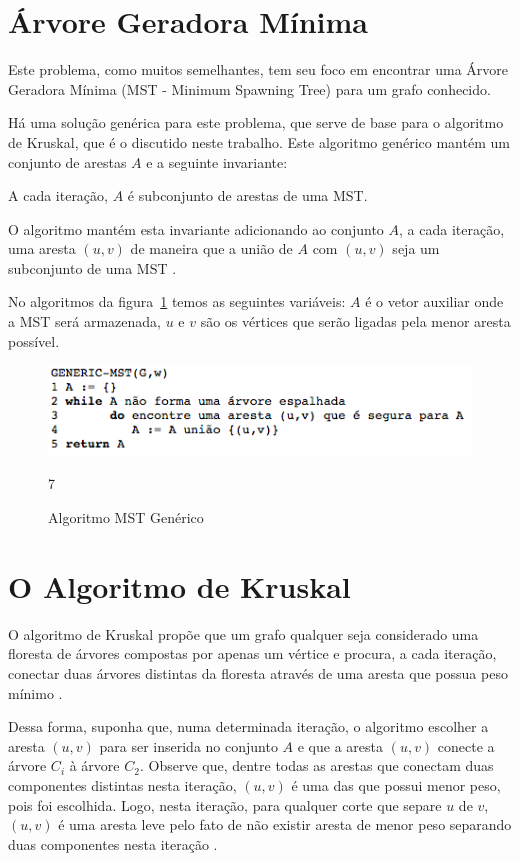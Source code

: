 \documentclass[12pt]{article}
\begin{document}
\section{Árvore Geradora Mínima}
	Este problema, como muitos semelhantes, tem seu foco em encontrar uma Árvore Geradora Mínima (MST - Minimum Spawning Tree)  para um grafo conhecido.
	
	Há uma solução genérica para este problema, que serve de base para o algoritmo de Kruskal, que é o discutido neste trabalho. Este algoritmo genérico mantém um conjunto de arestas $A$ e a seguinte invariante:
	
	A cada iteração, $A$ é subconjunto de arestas de uma MST. 
	
	O algoritmo mantém esta invariante adicionando ao conjunto $A$, a cada iteração, uma aresta $(u,v)$ de maneira que a união de $A$ com $(u,v)$ seja um subconjunto de uma MST \cite{paulo:15}.
	
	No algoritmos da figura~\ref{fig:gen_mst} temos as seguintes variáveis: $A$ é o vetor auxiliar onde a MST será armazenada, $u$ e $v$ são os vértices que serão ligadas pela menor aresta possível.
	
\begin{figure}[ht]
    \centering
    \includegraphics[width=1\textwidth]{imagens/generic_mst.png}
    \caption{Algoritmo MST Genérico}7
    \label{fig:gen_mst}
\end{figure}



\section{O Algoritmo de Kruskal}
O algoritmo de Kruskal propõe que um grafo qualquer seja considerado uma floresta de árvores compostas por apenas um vértice e procura, a cada iteração, conectar duas árvores distintas da floresta através de uma aresta que possua peso mínimo \cite{knuth:84}.

Dessa forma, suponha que, numa determinada iteração, o algoritmo escolher a aresta $(u,v)$ para ser inserida no conjunto $A$ e que a aresta $(u,v)$ conecte a árvore $C_i$ à árvore $C_2$. Observe que, dentre todas as arestas que conectam duas componentes distintas nesta iteração, $(u,v)$ é uma das que possui menor peso, pois foi escolhida. Logo, nesta iteração, para qualquer corte que separe $u$ de $v$, $(u,v)$ é uma aresta leve pelo fato de não existir aresta de menor peso separando duas componentes nesta iteração \cite{knuth:84}.
\end{document}
